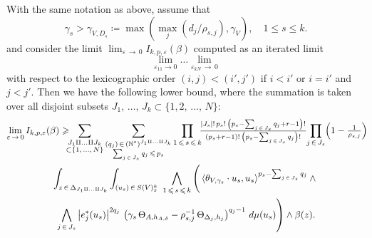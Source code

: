 \documentclass[AHL,Unicode,longabstracts,published]{cedram}
\DeclarePairedDelimiter{\abs}{\lvert}{\rvert}
\newcommand*\bN{\mathbb{N}}
\let\leq\leqslant
\let\geq\geqslant
\newcommand*\bydef{\coloneqq}
\begin{document}
\begin{prop}\label{6.41}
With the same notation as above, assume that
\[
\gamma_s>\gamma_{V,D_s}\bydef\max\left(\max_j(d_j/\rho_{s,j}),\gamma_V\right),\quad 1\leq s\leq k.
\]
and consider the limit $\lim_{\varepsilon\,\to\,0} I_{k,p,\varepsilon}(\beta)$ computed as an iterated limit
\[
\lim_{\varepsilon_{11}\to 0}\ldots\lim_{\varepsilon_{kN}\,\to\,0}
\]
with respect to the lexicographic order $(i,j)<(i',j')$ if $i<i'$ or $i=i'$ and $j<j'$. Then we have the following lower bound, where the summation is taken over all disjoint subsets $J_1,\,\dotsc,\,J_k
\subset\{1,2,\,\dotsc,\,N\}$:
\begin{multline*}
\lim_{\varepsilon\,\to\,0} I_{k,p,\varepsilon}(\beta)\geq{}\kern-8pt
\sum_{\substack{ J_1\amalg\ldots\amalg J_k\\
\subset\{1,\,\dotsc,\,N\}}}
\sum_{\substack{(q_j)\,\in\,(\bN^*)^{J_1\amalg\ldots\amalg J_k}\\
\sum_{j\,\in\,J_s}q_j\,\leq\,p_s}}
\prod_{1\,\leq\,s\,\leq\,k}\kern-4pt\tfrac{\abs{J_s}!\,p_s!\,\left(p_s-\sum_{j\,\in\,J_s}q_j+r-1\right)!}{ \left(p_s+r-1\right)!\,\left(p_s-\sum_{j\,\in\,J_s}q_j\right)!}\kern-2pt
\prod_{j\,\in\,J_s}\kern-2pt\left(1-\tfrac{1}{\rho_{s,j}}\right)\kern-3pt\\
\int_{z\,\in\,\Delta_{J_1\amalg\ldots\amalg J_k}}\int_{(u_s)\,\in\,S(V)^k_z}~
\bigwedge_{1\,\leq\,s\,\leq\,k}\Bigg(
\left\langle\theta_{V,\gamma_s}\cdot u_s,u_s\right\rangle^{p_s-\sum_{j\,\in\,J_s}q_j}
\wedge{}\\
\left. \bigwedge_{j\,\in\,J_s}\left|e_j^*(u_s)\right|^{2q_j}\,
\left(\gamma_s\,\Theta_{A,h_{A,\delta}}-\rho_{s,j}^{-1}\,\Theta_{\Delta_j,h_j}
\right)^{q_j-1}\,d\mu(u_s)\right)\wedge\beta(z).
\end{multline*}
\end{prop}
\end{document}
